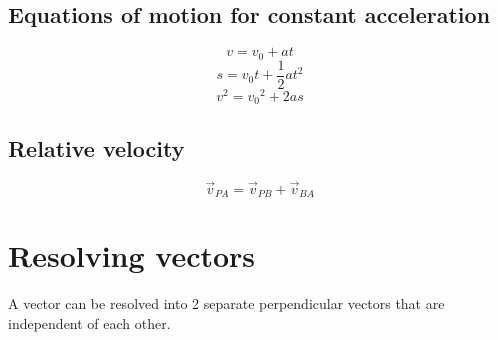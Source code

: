 \documentclass[11pt]{article}
\begin{document}
\subsection{Equations of motion for constant acceleration}
\label{sec:orga812f0a}

\[v = v_0 + at \tag{1}\]
\[s = v_0t + \frac{1}{2} at^2 \tag{2}\]
\[v^2 = {v_0}^2 + 2as \tag{3}\]

\subsection{Relative velocity}
\label{sec:org1c8c245}
\[\vec{v}_{PA} = \vec{v}_{PB} + \vec{v}_{BA}\]

\newpage

\section{Resolving vectors}
\label{sec:org34e6ea8}
A vector can be resolved into 2 separate perpendicular vectors that are independent of each other.
\end{document}

